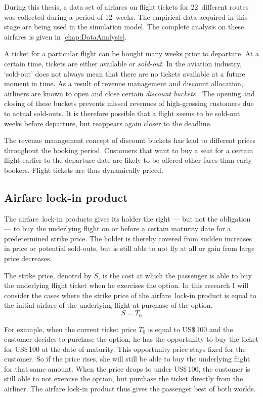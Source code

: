 During this thesis, a data set of airfares on flight tickets for 22~different routes was collected during a period of 12~weeks. The empirical data acquired in this stage are being used in the simulation model. The complete analysis on these airfares is given in \autoref{chap:DataAnalysis}.

A ticket for a particular flight can be bought many weeks prior to departure. At a certain time, tickets are either available or \emph{sold-out}. In the aviation industry, `sold-out' does not always mean that there are no tickets available at a future moment in time. As a result of revenue management and discount allocation, airliners are known to open and close certain \emph{discount buckets} \cite{mcgill1999revenue}. The opening and closing of these buckets prevents missed revenues of high-grossing customers due to actual sold-outs. It is therefore possible that a flight seems to be sold-out weeks before departure, but reappears again closer to the deadline.

The revenue management concept of discount buckets has lead to different prices throughout the booking period. Customers that want to buy a seat for a certain flight earlier to the departure date are likely to be offered other fares than early bookers. Flight tickets are thus dynamically priced.



\subsection{Airfare lock-in product}
The airfare~lock-in products gives its holder the right --- but not the obligation --- to buy the underlying flight on or before a certain maturity date for a predetermined strike price. The holder is thereby covered from sudden increases in price or potential sold-outs, but is still able to not fly at all or gain from large price decreases.

The strike price, denoted by $S$, is the cost at which the passenger is able to buy the underlying flight ticket when he exercises the option. In this research I will consider the cases where the strike price of the airfare~lock-in product is equal to the initial airfare of the underlying flight at purchase of the option.
$$S = T_0$$

For example, when the current ticket price $T_0$ is equal to US\$\,100 and the customer decides to purchase the option, he has the opportunity to buy the ticket for US\$\,100 at the date of maturity. This opportunity price stays fixed for the customer. So if the price rises, she will still be able to buy the underlying flight for that same amount. When the price drops to under US\$\,100, the customer is still able to not exercise the option, but purchase the ticket directly from the airliner. The airfare lock-in product thus gives the passenger best of both worlds.

